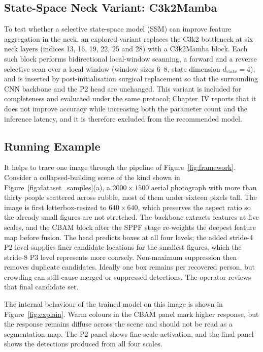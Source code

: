 \documentclass[12pt,a4paper,oneside]{report}
\begin{document}
\subsection{State-Space Neck Variant: C3k2Mamba}
\label{sec:mamba}
To test whether a selective state-space model (SSM) can improve feature
aggregation in the neck, an explored variant replaces the C3k2 bottleneck at six
neck layers (indices 13, 16, 19, 22, 25 and 28) with a C3k2Mamba block. Each such
block performs bidirectional local-window scanning, a forward and a reverse
selective scan over a local window (window sizes 6--8, state dimension
$d_{\text{state}} = 4$), and is inserted by post-initialisation surgical
replacement so that the surrounding CNN backbone and the P2 head are unchanged.
This variant is included for completeness and evaluated under the same protocol;
Chapter~IV reports that it does not improve accuracy while increasing both the
parameter count and the inference latency, and it is therefore excluded from the
recommended model.

\subsection{Running Example}
It helps to trace one image through the pipeline of Figure~\ref{fig:framework}.
Consider a collapsed-building scene of the kind shown in
Figure~\ref{fig:dataset_samples}(a), a $2000\times1500$ aerial photograph with more
than thirty people scattered across rubble, most of them under sixteen pixels tall.
The image is first letterbox-resized to $640\times640$, which preserves the aspect
ratio so the already small figures are not stretched. The backbone extracts
features at five scales, and the CBAM block after the SPPF stage re-weights the
deepest feature map before fusion. The head predicts boxes at all four levels;
the added stride-4 P2 level supplies finer candidate locations for the smallest
figures, which the stride-8 P3 level represents more coarsely. Non-maximum
suppression then removes duplicate candidates. Ideally one box remains per
recovered person, but crowding can still cause merged or suppressed detections.
The operator reviews that final candidate set.

The internal behaviour of the trained model on this image is shown in
Figure~\ref{fig:explain}. Warm colours in the CBAM panel mark higher response,
but the response remains diffuse across the scene and should not be read as a
segmentation map. The P2 panel shows fine-scale activation, and the final panel
shows the detections produced from all four scales.
\end{document}
